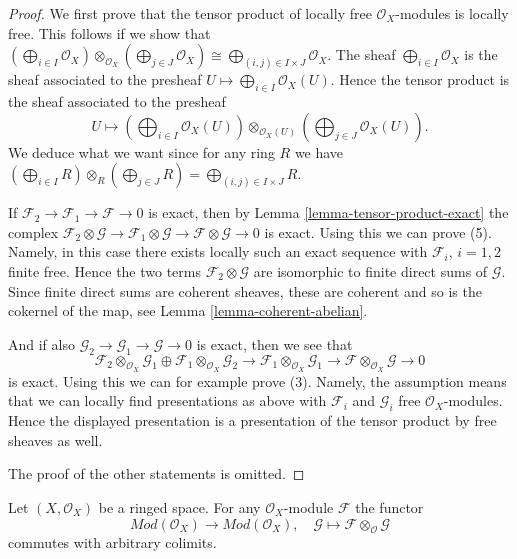 \begin{proof}
We first prove that the tensor product of locally free
$\mathcal{O}_X$-modules is locally free. This follows if we show
that
$(\bigoplus_{i \in I} \mathcal{O}_X) \otimes_{\mathcal{O}_X}
(\bigoplus_{j \in J} \mathcal{O}_X) \cong
\bigoplus_{(i, j) \in I \times J} \mathcal{O}_X$.
The sheaf $\bigoplus_{i \in I} \mathcal{O}_X$ is the sheaf associated
to the presheaf $U \mapsto \bigoplus_{i \in I} \mathcal{O}_X(U)$.
Hence the tensor product is the sheaf associated
to the presheaf
$$
U \longmapsto
(\bigoplus\nolimits_{i \in I} \mathcal{O}_X(U))
\otimes_{\mathcal{O}_X(U)}
(\bigoplus\nolimits_{j \in J} \mathcal{O}_X(U)).
$$
We deduce what we want since for any ring $R$ we have
$(\bigoplus_{i \in I} R) \otimes_R (\bigoplus_{j \in J} R) =
\bigoplus_{(i, j) \in I \times J} R$.

\medskip\noindent
If $\mathcal{F}_2 \to \mathcal{F}_1 \to \mathcal{F} \to 0$
is exact, then by Lemma \ref{lemma-tensor-product-exact}
the complex
$\mathcal{F}_2 \otimes \mathcal{G} \to
\mathcal{F}_1 \otimes \mathcal{G} \to
\mathcal{F} \otimes \mathcal{G} \to 0$
is exact. Using this we can prove (5). Namely, in this case there
exists locally such an exact sequence with $\mathcal{F}_i$, $i = 1, 2$
finite free. Hence the two terms $\mathcal{F}_2 \otimes \mathcal{G}$
are isomorphic to finite direct sums of $\mathcal{G}$.
Since finite direct sums are coherent sheaves, these are coherent
and so is the cokernel of the map, see Lemma \ref{lemma-coherent-abelian}.

\medskip\noindent
And if also
$\mathcal{G}_2 \to \mathcal{G}_1 \to \mathcal{G} \to 0$
is exact, then we see that
$$
\mathcal{F}_2 \otimes_{\mathcal{O}_X} \mathcal{G}_1
\oplus
\mathcal{F}_1 \otimes_{\mathcal{O}_X} \mathcal{G}_2
\to
\mathcal{F}_1 \otimes_{\mathcal{O}_X} \mathcal{G}_1
\to
\mathcal{F} \otimes_{\mathcal{O}_X} \mathcal{G}
\to 0
$$
is exact. Using this we can for example prove (3).
Namely, the assumption means that we can locally find presentations
as above with $\mathcal{F}_i$ and $\mathcal{G}_i$
free $\mathcal{O}_X$-modules. Hence the displayed presentation
is a presentation of the tensor product by free sheaves as well.

\medskip\noindent
The proof of the other statements is omitted.
\end{proof}

\begin{lemma}
\label{lemma-tensor-commute-colimits}
Let $(X, \mathcal{O}_X)$ be a ringed space.
For any $\mathcal{O}_X$-module $\mathcal{F}$ the functor
$$
\textit{Mod}(\mathcal{O}_X) \longrightarrow \textit{Mod}(\mathcal{O}_X)
, \quad
\mathcal{G} \longmapsto \mathcal{F} \otimes_\mathcal{O} \mathcal{G}
$$
commutes with arbitrary colimits.
\end{lemma}

